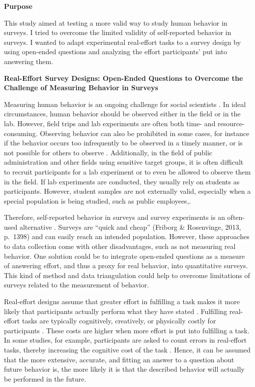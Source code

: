 \documentclass{article}
\begin{document}
\textbf{Purpose}

This study aimed at testing a more valid way to study human behavior in surveys. I tried to overcome the limited validity of self-reported behavior in surveys. I wanted to adapt experimental real-effort tasks to a survey design by using open-ended questions and analyzing the effort participants' put into answering them.

\textbf{}

\textbf{Real-Effort Survey Designs: Open-Ended Questions to Overcome the Challenge of Measuring Behavior in Surveys}

Measuring human behavior is an ongoing challenge for social scientists \parencite{Schwarz2001}. In ideal circumstances, human behavior should be observed either in the field or in the lab. However, field trips and lab experiments are often both time- and resource-consuming. Observing behavior can also be prohibited in some cases, for instance if the behavior occurs too infrequently to be observed in a timely manner, or is not possible for others to observe \parencite[pp. 128][]{Schwarz2001}. Additionally, in the field of public administration and other fields using sensitive target groups, it is often difficult to recruit participants for a lab experiment or to even be allowed to observe them in the field. If lab experiments are conducted, they usually rely on students as participants. However, student samples are not externally valid, especially when a special population is being studied, such as public employees,. 

Therefore, self-reported behavior in surveys and survey experiments is an often-used alternative \parencite[pp. 120][]{James2017}. Surveys are “quick and cheap” (Friborg \& Rosenvinge, 2013, p. 1398) and can easily reach an intended population. However, these approaches to data collection come with other disadvantages, such as not measuring real behavior. One solution could be to integrate open-ended questions as a measure of answering effort, and thus a proxy for real behavior, into quantitative surveys. This kind of method and data triangulation could help to overcome limitations of surveys related to the measurement of behavior. 

Real-effort designs assume that greater effort in fulfilling a task makes it more likely that participants actually perform what they have stated \parencite{Dutcher2015}. Fulfilling real-effort tasks are typically cognitively, creatively, or physically costly for participants \parencite{Charness2018}. These costs are higher when more effort is put into fulfilling a task. In some studies, for example, participants are asked to count errors in real-effort tasks, thereby increasing the cognitive cost of the task \parencite{Andersen2018, Gneezy2006}. Hence, it can be assumed that the more extensive, accurate, and fitting an answer to a question about future behavior is, the more likely it is that the described behavior will actually be performed in the future. 
\end{document}
